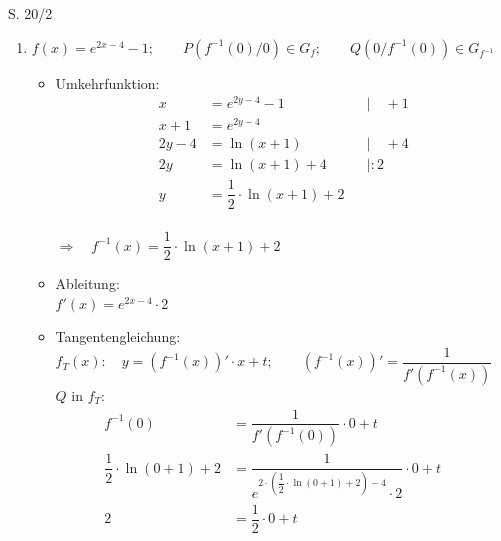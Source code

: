 \begin{Exercise}{S. 20/2}{}
\begin{enumerate}
\begin{enumerate}[label=\alph*)]
{\begin{itemize}[leftmargin=*]
                \end{itemize}
                }
            \item[d)] {
                $f(x) = e^{2x-4}-1; \qquad P(f^{-1}(0)/0) \in G_{f}; \qquad Q(0/f^{-1}(0)) \in G_{f^{-1}}$\\[-2.0ex]
                \begin{itemize}[leftmargin=*]
                    \item Umkehrfunktion: \\{
                        \vspace{-3.0ex}
                        \begin{align*}
                            x &= e^{2y -4} - 1 &&| \quad + 1\\[1.5ex]
                            x + 1 &= e^{2y -4} &&\\[1.5ex]
                            2y -4 &= \ln(x + 1) &&| \quad + 4\\[1.5ex]
                            2y &= \ln(x + 1) + 4 && | :2\\[1.5ex]
                            y &= \dfrac{1}{2} \cdot \ln(x + 1) + 2 &&
                        \end{align*}\\[-1.0ex]
                        $\Rightarrow \quad f^{-1}(x) = \dfrac{1}{2} \cdot \ln(x + 1) + 2$\\[-2.0ex]
                        }
                    \item Ableitung: \\[2.0ex]{
                        $f'(x) = e^{2x-4} \cdot 2$\\[-2.0ex]
                        }
                    \item Tangentengleichung: \\[2.0ex]{
                        $f_{T}(x): \quad y = \left(f^{-1}(x)\right)' \cdot x + t; \qquad \left(f^{-1}(x)\right)' = \dfrac{1}{f'\left(f^{-1}(x)\right)}$\\[2.0ex]
                        $Q$ in $f_{T}$: \\[-2.0ex]
                        \begin{align*}
                            f^{-1}(0) &= \dfrac{1}{f'\left(f^{-1}(0)\right)} \cdot 0 + t &&\\[1.5ex]
                            \dfrac{1}{2} \cdot \ln(0 + 1) + 2 &= \dfrac{1}{e^{2 \cdot \left(\dfrac{1}{2} \cdot \ln\left(0 + 1\right) + 2\right) -4} \cdot 2} \cdot 0 + t &&\\[2.0ex]
                            2 &= \dfrac{1}{2} \cdot 0 + t &&\\[1.5ex]

\end{align*}}
\end{itemize}}
\end{enumerate}
\end{enumerate}
\end{Exercise}
